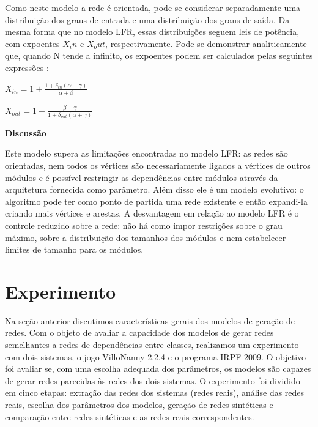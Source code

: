 \documentclass{acm_proc_article-sp}
\begin{document}
Como neste modelo a rede é orientada, pode-se considerar separadamente uma distribuição dos graus de entrada e uma distribuição dos graus de saída. Da mesma forma que no modelo LFR, essas distribuições seguem leis de potência, com expoentes $X_in$ e $X_out$, respectivamente. Pode-se demonstrar analiticamente que, quando N tende a infinito, os expoentes podem ser calculados pelas seguintes expressões \cite{Bollobas2003}:

$X_{in} = 1 + \frac{1 + \delta_{in}(\alpha + \gamma)}{\alpha + \beta}$

$X_{out} = 1 + \frac{\beta + \gamma}{1 + \delta_{out}(\alpha + \gamma)}$

  \textbf{Discussão}

Este modelo supera as limitações encontradas no modelo LFR: as redes são orientadas, nem todos os vértices são necessariamente ligados a vértices de outros módulos e é possível restringir as dependências entre módulos através da arquitetura fornecida como parâmetro. Além disso ele é um modelo evolutivo: o algoritmo pode ter como ponto de partida uma rede existente e então expandi-la criando mais vértices e arestas. A desvantagem em relação ao modelo LFR é o controle reduzido sobre a rede: não há como impor restrições sobre o grau máximo, sobre a distribuição dos tamanhos dos módulos e nem estabelecer limites de tamanho para os módulos.


\section{Experimento} %

Na seção anterior discutimos características gerais dos modelos de geração de redes. Com o objeto de avaliar a capacidade dos modelos de gerar redes semelhantes a redes de dependências entre classes, realizamos um experimento com dois sistemas, o jogo VilloNanny 2.2.4 e o programa IRPF 2009. O objetivo foi avaliar se, com uma escolha adequada dos parâmetros, os modelos são capazes de gerar redes parecidas às redes dos dois sistemas. O experimento foi dividido em cinco etapas: extração das redes dos sistemas (redes reais), análise das redes reais, escolha dos parâmetros dos modelos, geração de redes sintéticas e comparação entre redes sintéticas e as redes reais correspondentes. 
\end{document}
